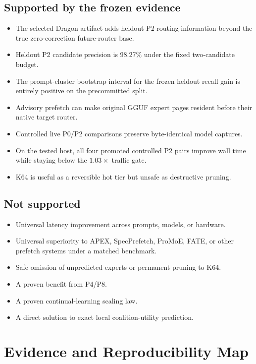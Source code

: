 \documentclass[11pt]{article}
\begin{document}
\subsection{Supported by the frozen evidence}
\begin{itemize}
  \item The selected Dragon artifact adds heldout P2 routing information beyond the true zero-correction future-router base.
  \item Heldout P2 candidate precision is 98.27\% under the fixed two-candidate budget.
  \item The prompt-cluster bootstrap interval for the frozen heldout recall gain is entirely positive on the precommitted split.
  \item Advisory prefetch can make original GGUF expert pages resident before their native target router.
  \item Controlled live P0/P2 comparisons preserve byte-identical model captures.
  \item On the tested host, all four promoted controlled P2 pairs improve wall time while staying below the $1.03\times$ traffic gate.
  \item K64 is useful as a reversible hot tier but unsafe as destructive pruning.
\end{itemize}

\subsection{Not supported}
\begin{itemize}
  \item Universal latency improvement across prompts, models, or hardware.
  \item Universal superiority to APEX, SpecPrefetch, ProMoE, FATE, or other prefetch systems under a matched benchmark.
  \item Safe omission of unpredicted experts or permanent pruning to K64.
  \item A proven benefit from P4/P8.
  \item A proven continual-learning scaling law.
  \item A direct solution to exact local coalition-utility prediction.
\end{itemize}

\section{Evidence and Reproducibility Map}
\end{document}
